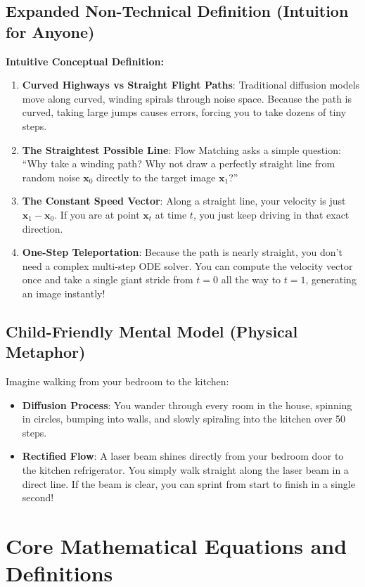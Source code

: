 \documentclass[11pt,a4paper]{article}
\theoremstyle{definition}
\begin{document}
\subsection{Expanded Non-Technical Definition (Intuition for Anyone)}
\textbf{Intuitive Conceptual Definition:}
\begin{enumerate}
    \item \textbf{Curved Highways vs Straight Flight Paths}: Traditional diffusion models move along curved, winding spirals through noise space. Because the path is curved, taking large jumps causes errors, forcing you to take dozens of tiny steps.
    \item \textbf{The Straightest Possible Line}: Flow Matching asks a simple question: ``Why take a winding path? Why not draw a perfectly straight line from random noise $\mathbf{x}_0$ directly to the target image $\mathbf{x}_1$?''
    \item \textbf{The Constant Speed Vector}: Along a straight line, your velocity is just $\mathbf{x}_1 - \mathbf{x}_0$. If you are at point $\mathbf{x}_t$ at time $t$, you just keep driving in that exact direction.
    \item \textbf{One-Step Teleportation}: Because the path is nearly straight, you don't need a complex multi-step ODE solver. You can compute the velocity vector once and take a single giant stride from $t = 0$ all the way to $t = 1$, generating an image instantly!
\end{enumerate}

\subsection{Child-Friendly Mental Model (Physical Metaphor)}
Imagine walking from your bedroom to the kitchen:
\begin{itemize}
    \item \textbf{Diffusion Process}: You wander through every room in the house, spinning in circles, bumping into walls, and slowly spiraling into the kitchen over 50 steps.
    \item \textbf{Rectified Flow}: A laser beam shines directly from your bedroom door to the kitchen refrigerator. You simply walk straight along the laser beam in a direct line. If the beam is clear, you can sprint from start to finish in a single second!
\end{itemize}

\section{Core Mathematical Equations and Definitions}
\end{document}
